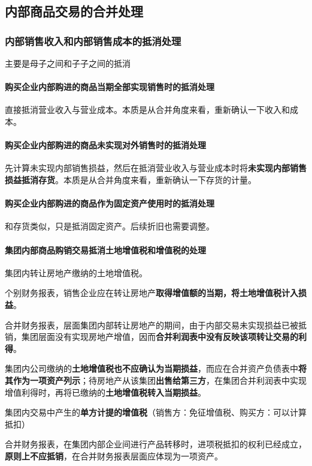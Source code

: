 \documentclass[UTF8,12pt]{ctexart}
\numberwithin{equation}{section} %
\numberwithin{figure}{section}
\numberwithin{table}{section}
\begin{document}
	\subsection{内部商品交易的合并处理}
	\subsubsection{内部销售收入和内部销售成本的抵消处理}
	主要是母子之间和子子之间的抵消
	\paragraph{购买企业内部购进的商品当期全部实现销售时的抵消处理}
	直接抵消营业收入与营业成本。本质是从合并角度来看，重新确认一下收入和成本。
	
	\paragraph{购买企业内部购进的商品未实现对外销售时的抵消处理}
	先计算未实现内部销售损益，然后在抵消营业收入与营业成本时将\textbf{未实现内部销售损益抵消存货}。本质是从合并角度来看，重新确认一下存货的计量。
	
	\paragraph{购买企业内部购进的商品作为固定资产使用时的抵消处理}
	和存货类似，只是抵消固定资产。后续折旧也需要调整。
	
	\paragraph{集团内部商品购销交易抵消土地增值税和增值税的处理}
	集团内转让房地产缴纳的土地增值税。
	
	个别财务报表，销售企业应在转让房地产\textbf{取得增值额的当期，将土地增值税计入损益}。
	
	合并财务报表，层面集团内部转让房地产的期间，由于内部交易未实现损益已被抵销，集团层面没有实现房地产增值，因而\textbf{合并利润表中没有反映该项转让交易的利得}。
	
	集团内公司缴纳的\textbf{土地增值税也不应确认为当期损益}，而应在合并资产负债表中\textbf{将其作为一项资产列示}；待房地产从该集团\textbf{出售给第三方}，在集团合并利润表中实现增值利得时，再将已缴纳的\textbf{土地增值税转入当期损益}。
	
	集团内交易中产生的\textbf{单方计提的增值税}（销售方：免征增值税、购买方：可以计算抵扣）
	
	合并财务报表，在集团内部企业间进行产品转移时，进项税抵扣的权利已经成立，\textbf{原则上不应抵销}，在合并财务报表层面应体现为一项资产。
	
\end{document}
